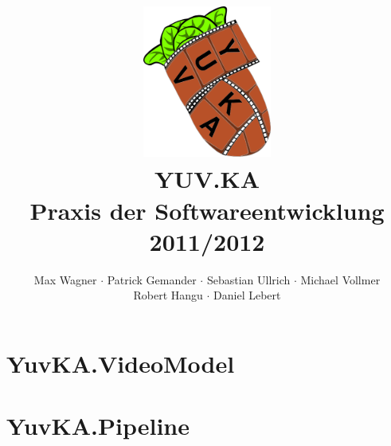 \documentclass{scrartcl}
\begin{document}
\title{
    \hspace{-0.5cm} \includegraphics[height=5cm]{logo.png} \\[1cm]
    \Huge{YUV.KA} \\ \large{Praxis der Softwareentwicklung 2011/2012}
}
\author{Max Wagner $\cdot$ Patrick Gemander $\cdot$ Sebastian Ullrich $\cdot$ Michael Vollmer \\ Robert Hangu $\cdot$ Daniel Lebert}
\maketitle

\newpage
\mbox{}
\newpage
\mbox{}

\tableofcontents
\newpage
\mbox{}
\newpage
\section{YuvKA.VideoModel}

\section{YuvKA.Pipeline}






\end{document}
